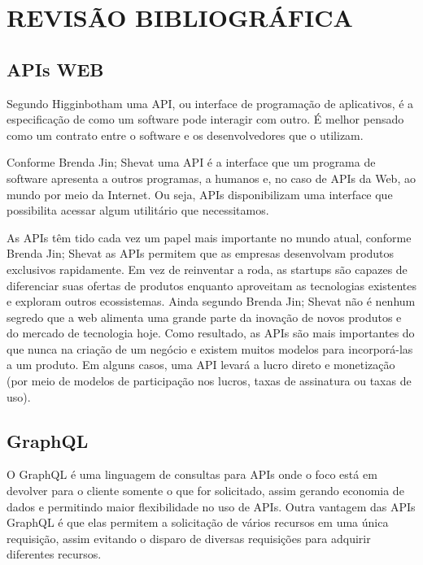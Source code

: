 \chapter{REVISÃO BIBLIOGRÁFICA}
\label{chap:revisao}
\section{APIs WEB}

Segundo Higginbotham \cite{higginbotham2015} uma API, ou interface de programação de aplicativos, é a especificação de como um software pode interagir com outro. É melhor pensado como um contrato entre o software e os desenvolvedores que o utilizam.

Conforme Brenda Jin; Shevat \cite{jin2018} uma API é a interface que um programa de software apresenta a outros programas, a humanos e, no caso de APIs da Web, ao mundo por meio da Internet. Ou seja, APIs disponibilizam uma interface que possibilita acessar algum utilitário que necessitamos.

As APIs têm tido cada vez um papel mais importante no mundo atual, conforme Brenda Jin; Shevat \cite{jin2018} as APIs permitem que as empresas desenvolvam produtos exclusivos rapidamente. Em vez de reinventar a roda, as startups são capazes de diferenciar suas ofertas de produtos enquanto aproveitam as tecnologias existentes e exploram outros ecossistemas. Ainda segundo Brenda Jin; Shevat \cite{jin2018} não é nenhum segredo que a web alimenta uma grande parte da inovação de novos produtos e do mercado de tecnologia hoje. Como resultado, as APIs são mais importantes do que nunca na criação de um negócio e existem muitos modelos para incorporá-las a um produto. Em alguns casos, uma API levará a lucro direto e monetização (por meio de modelos de participação nos lucros, taxas de assinatura ou taxas de uso).

\section{GraphQL}
O GraphQL \cite{graphql} é uma linguagem de consultas para APIs onde o foco está em devolver para o cliente somente o que for solicitado, assim gerando economia de dados e permitindo maior flexibilidade no uso de APIs. Outra vantagem das APIs GraphQL \cite{graphql} é que elas permitem a solicitação de vários recursos em uma única requisição, assim evitando o disparo de diversas requisições para adquirir diferentes recursos.

